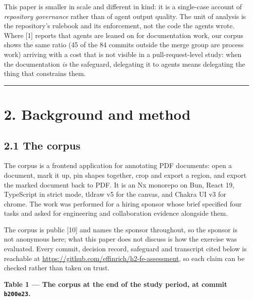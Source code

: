 \documentclass[11pt,a4paper]{article}
\begin{document}
This paper is smaller in scale and different in kind: it is a single-case account of \emph{repository governance} rather than of agent output quality. The unit of analysis is the repository's rulebook and its enforcement, not the code the agents wrote. Where [1] reports that agents are leaned on for documentation work, our corpus shows the same ratio (45 of the 84 commits outside the merge group are process work) arriving with a cost that is not visible in a pull-request-level study: when the documentation \emph{is} the safeguard, delegating it to agents means delegating the thing that constrains them.

\medskip\hrule\medskip

\section*{2. Background and method}

\subsection*{2.1 The corpus}

The corpus is a frontend application for annotating PDF documents: open a document, mark it up, pin shapes together, crop and export a region, and export the marked document back to PDF. It is an Nx monorepo on Bun, React 19, TypeScript in strict mode, tldraw v5 for the canvas, and Chakra UI v3 for chrome. The work was performed for a hiring sponsor whose brief specified four tasks and asked for engineering and collaboration evidence alongside them.

The corpus is public [10] and names the sponsor throughout, so the sponsor is not anonymous here; what this paper does not discuss is how the exercise was evaluated. Every commit, decision record, safeguard and transcript cited below is reachable at \url{https://github.com/effinrich/h2-fe-assessment}, so each claim can be checked rather than taken on trust.

\textbf{Table 1 --- The corpus at the end of the study period, at commit \texttt{b200e23}.}
\end{document}
